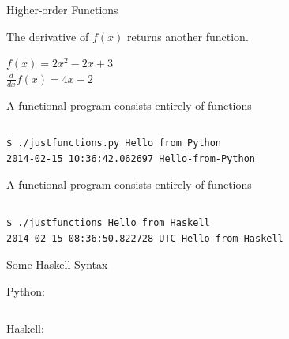 \documentclass[mathserif]{beamer}
\begin{document}
\begin{frame}{Higher-order Functions}

  {\Large The derivative of $f(x)$ returns another function.}

  \vskip5mm

  {\Large $f(x) = 2x^2 - 2x + 3$}\\
  {\Large $\frac{d}{dx} f(x) = 4x - 2$}


\end{frame}

\begin{frame}[fragile]{A functional program consists entirely of functions}

  \inputminted[firstline=6,lastline=15]{python}{code/python/justfunctions.py}

  \begin{verbatim}
$ ./justfunctions.py Hello from Python
2014-02-15 10:36:42.062697 Hello-from-Python
  \end{verbatim}

\end{frame}

\begin{frame}[fragile]{A functional program consists entirely of functions}

  \inputminted[firstline=5]{haskell}{code/haskell/justfunctions.hs}

  \begin{verbatim}
$ ./justfunctions Hello from Haskell
2014-02-15 08:36:50.822728 UTC Hello-from-Haskell
  \end{verbatim}

\end{frame}

\begin{frame}{Some Haskell Syntax}

  Python:
  \inputminted[fontsize=\large,firstline=11,lastline=12]{python}{code/python/justfunctions.py}
  \vskip5mm
  Haskell:
  \inputminted[fontsize=\large,firstline=11,lastline=13]{haskell}{code/haskell/justfunctions.hs}

\end{frame}
\end{document}
